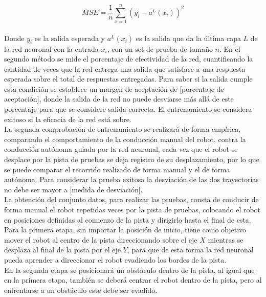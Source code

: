 \documentclass{iccmemoria}
\begin{document}
\begin{equation}
	MSE = \frac{1}{n} \sum^n_{x=1} (y_i-a^L(x_i))^2
\end{equation}\\

Donde $y_i$ es la salida esperada y $a^L(x_i)$ es la salida que da la última capa $L$ de la red neuronal con la entrada $x_i$, con un set de prueba de tamaño $n$. En el segundo método se mide el porcentaje de efectividad de la red, cuantificando la cantidad de veces que la red entrega una salida que satisface a una respuesta esperada sobre el total de respuestas entregadas. Para saber si la salida cumple esta condición se establece un margen de aceptación de [porcentaje de aceptación], donde la salida de la red no puede desviarse más allá de este porcentaje para que se considere salida correcta. El entrenamiento se considera exitoso si la eficacia de la red está sobre.\\
 
La segunda comprobación de entrenamiento se realizará de forma empírica, comparando el comportamiento de la conducción manual del robot, contra la conducción autónoma guiada por la red neuronal, cada vez que el robot se desplace por la pista de pruebas se deja registro de su desplazamiento, por lo que se puede comparar el recorrido realizado de forma manual y el de forma autónoma. Para considerar la prueba exitosa la desviación de las dos trayectorias no debe ser mayor a [medida de desviación].\\
 
La obtención del conjunto datos, para realizar las pruebas, consta de conducir de forma manual el robot repetidas veces por la pista de pruebas, colocando el robot en posiciones definidas al comienzo de la pista y dirigirlo hasta el final de esta.\\
 
Para la primera etapa, sin importar la posición de inicio, tiene como objetivo mover el robot al centro de la pista direccionando sobre el eje $X$ mientras se desplaza al final de la pista por el eje $Y$, para que de esta forma la red neuronal pueda aprender a direccionar el robot evadiendo los bordes de la pista.\\
 
En la segunda etapa se posicionará un obstáculo dentro de la pista, al igual que en la primera etapa, también se deberá centrar el robot dentro de la pista, pero al enfrentarse a un obstáculo este debe ser evadido.\\
\end{document}
